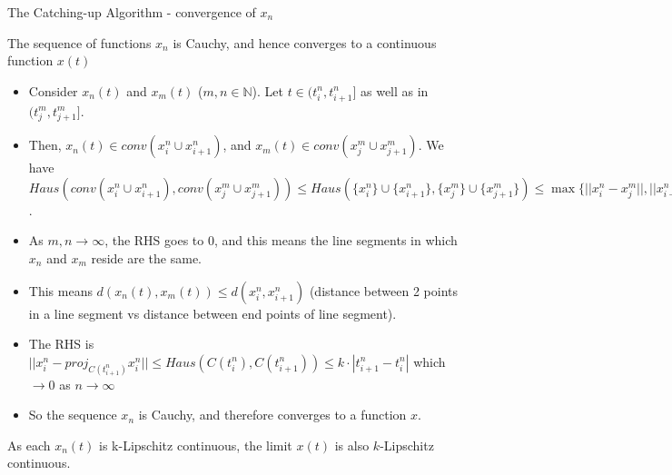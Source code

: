 \documentclass[8pt,aspectratio=169]{beamer}
\begin{document}
\begin{frame}[fragile]{The Catching-up Algorithm - convergence of $x_n$}
    \begin{block}{The sequence of functions $x_n$ is Cauchy, and hence converges to a continuous function $x(t)$}
        \begin{itemize}
            \item Consider $x_n(t)$ and $x_m(t)$ ($m, n \in \mathbb{N}$). Let $t \in (t_i^n, t_{i+1}^n]$ as well as in $(t_j^m, t_{j+1}^m]$.
            \item Then, $x_n(t) \in conv(x_i^n\cup x_{i+1}^n)$, and $x_m(t) \in conv(x_j^m\cup x_{j+1}^m)$. We have $Haus(conv(x_i^n\cup x_{i+1}^n), conv(x_j^m\cup x_{j+1}^m)) \leq Haus(\{x_i^n\}\cup\{x_{i+1}^n\}, \{x_j^m\}\cup\{x_{j+1}^m\}) \leq \max\{||x_i^n - x_j^m||, ||x_{i+1}^n - x_{j+1}^m||\}$.
            \item As $m,n \to \infty$, the RHS goes to 0, and this means the line segments in which $x_n$ and $x_m$ reside are the same. 
            \item This means $d(x_n(t), x_m(t)) \leq d(x_i^n, x_{i+1}^n)$ (distance between 2 points in a line segment vs distance between end points of line segment). 
            \item The RHS is $||x_i^n - proj_{C(t_{i+1}^n)}x_{i}^n|| \leq Haus(C(t_i^n), C(t_{i+1}^n)) \leq k\cdot |t_{i+1}^n - t_i^n|$ which $ \to 0$ as $n \to \infty$
            \item So the sequence $x_n$ is Cauchy, and therefore converges to a function $x$.
        \end{itemize}   
    \end{block}
    As each $x_n(t)$ is k-Lipschitz continuous, the limit $x(t)$ is also $k$-Lipschitz continuous.
\end{frame}
\end{document}
